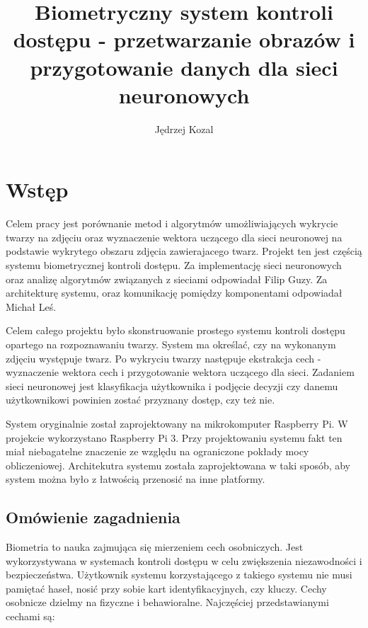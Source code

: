 \documentclass[oneside, eng]{mgr}
\title{Biometryczny system kontroli dostępu - przetwarzanie obrazów i przygotowanie danych dla sieci neuronowych}
\author{Jędrzej Kozal}
\begin{document}


\maketitle

\linespread{1.5}

\chapter{Wstęp}
	Celem pracy jest porównanie metod i algorytmów umożliwiających wykrycie twarzy na zdjęciu oraz wyznaczenie wektora uczącego dla sieci neuronowej na podstawie wykrytego obszaru zdjęcia zawierajacego twarz. Projekt ten jest częścią systemu biometrycznej kontroli dostępu. Za implementację sieci neuronowych oraz analizę algorytmów związanych z sieciami odpowiadał Filip Guzy. Za architekturę systemu, oraz komunikację pomiędzy komponentami odpowiadał Michał Leś. 

Celem całego projektu było skonstruowanie prostego systemu kontroli dostępu opartego na rozpoznawaniu twarzy. System ma określać, czy na wykonanym zdjęciu występuje twarz. Po wykryciu twarzy następuje ekstrakcja cech - wyznaczenie wektora cech i przygotowanie wektora uczącego dla sieci. Zadaniem sieci neuronowej jest klasyfikacja użytkownika i podjęcie decyzji czy danemu użytkownikowi powinien zostać przyznany dostęp, czy też nie.

System oryginalnie został zaprojektowany na mikrokomputer Raspberry Pi. W projekcie wykorzystano Raspberry Pi 3. Przy projektowaniu systemu fakt ten miał niebagatelne znaczenie ze względu na ograniczone pokłady mocy obliczeniowej. Architekutra systemu została zaprojektowana w taki sposób, aby system można było z łatwością przenosić na inne platformy. 


\section{Omówienie zagadnienia}

Biometria to nauka zajmująca się mierzeniem cech osobniczych. Jest wykorzystywana w systemach kontroli dostępu w celu zwiększenia niezawodności i bezpieczeństwa. Użytkownik systemu korzystającego z takiego systemu nie musi pamiętać haseł, nosić przy sobie kart identyfikacyjnych, czy kluczy. Cechy osobnicze dzielmy na fizyczne i behawioralne. Najczęściej przedstawianymi cechami są:
\end{document}
